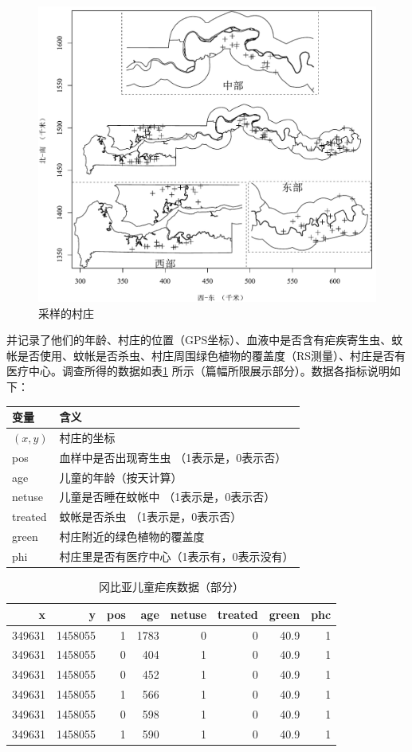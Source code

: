 \documentclass[hyperref, a4paper, UTF8, zihao = -4, linespread = 1.25, scheme = chinese]{ctexbook}
\begin{document}
\begin{figure}

{\centering \includegraphics[width=0.7\linewidth]{figures/gambia-map} 

}

\caption{采样的村庄}\label{fig:map-gambia}
\end{figure}

并记录了他们的年龄、村庄的位置（GPS坐标）、血液中是否含有疟疾寄生虫、蚊帐是否使用、蚊帐是否杀虫、村庄周围绿色植物的覆盖度（RS测量）、村庄是否有医疗中心\citep{Diggle2002}。调查所得的数据如表\ref{tab:gambia-malaria}
所示（篇幅所限展示部分）。数据各指标说明如下：

\begin{longtable}[]{@{}ll@{}}
\toprule
变量 & 含义\tabularnewline
\midrule
\endhead
\((x,y)\) & 村庄的坐标\tabularnewline
pos & 血样中是否出现寄生虫 （1表示是，0表示否）\tabularnewline
age & 儿童的年龄（按天计算）\tabularnewline
netuse & 儿童是否睡在蚊帐中 （1表示是，0表示否）\tabularnewline
treated & 蚊帐是否杀虫 （1表示是，0表示否）\tabularnewline
green & 村庄附近的绿色植物的覆盖度\tabularnewline
phi & 村庄里是否有医疗中心（1表示有，0表示没有）\tabularnewline
\bottomrule
\end{longtable}

\newpage

\begin{table}

\caption{\label{tab:gambia-malaria}冈比亚儿童疟疾数据（部分）}
\centering
\begin{tabular}[t]{rrrrrrrr}
\toprule
x & y & pos & age & netuse & treated & green & phc\\
\midrule
349631 & 1458055 & 1 & 1783 & 0 & 0 & 40.9 & 1\\
349631 & 1458055 & 0 & 404 & 1 & 0 & 40.9 & 1\\
349631 & 1458055 & 0 & 452 & 1 & 0 & 40.9 & 1\\
349631 & 1458055 & 1 & 566 & 1 & 0 & 40.9 & 1\\
349631 & 1458055 & 0 & 598 & 1 & 0 & 40.9 & 1\\
349631 & 1458055 & 1 & 590 & 1 & 0 & 40.9 & 1\\
\bottomrule
\end{tabular}
\end{table}
\end{document}
